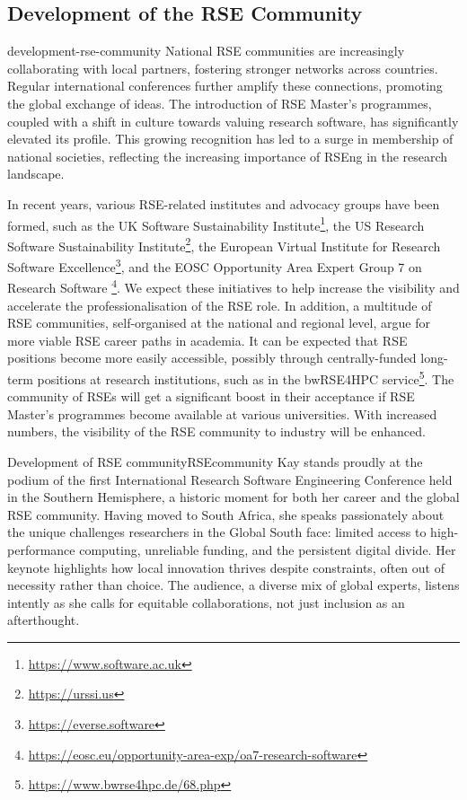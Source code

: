 \documentclass{eceasst}
\begin{document}
\subsection{Development of the RSE Community}
\begin{whatis}{}{development-rse-community}
National RSE communities are increasingly collaborating with local partners,
fostering stronger networks across countries.
Regular international conferences further amplify these connections,
promoting the global exchange of ideas. The introduction of RSE Master's programmes,
coupled with a shift in culture towards valuing research software,
has significantly elevated its profile.
This growing recognition has led to a surge in membership of national societies,
reflecting the increasing importance of RSEng in the research landscape.
\end{whatis}
In recent years, various RSE-related institutes and advocacy groups have been formed, such as
the UK Software Sustainability Institute\footnote{\url{https://www.software.ac.uk}},
the US Research Software Sustainability Institute\footnote{\url{https://urssi.us}},
the European Virtual Institute for Research Software Excellence\footnote{\url{https://everse.software}},
and the EOSC Opportunity Area Expert Group 7 on Research Software%
\footnote{\url{https://eosc.eu/opportunity-area-exp/oa7-research-software}}.
We expect these initiatives to help increase the visibility and accelerate
the professionalisation of the RSE role.
In addition, a multitude of RSE communities, self-organised at the national and regional level,
argue for more viable RSE career paths in academia.
It can be expected that RSE positions become more easily accessible,
possibly through centrally-funded long-term positions at research institutions,
such as in the bwRSE4HPC service\footnote{\url{https://www.bwrse4hpc.de/68.php}}.
The community of RSEs will get a significant boost in their acceptance
if RSE Master's programmes become available at various universities.
With increased numbers, the visibility of the RSE community to industry will be enhanced.
\begin{story}{Development of RSE community}{RSEcommunity}
Kay stands proudly at the podium of the first International Research
Software Engineering Conference held in the Southern Hemisphere,
a historic moment for both her career and the global RSE community.
Having moved to South Africa, she speaks passionately about the unique
challenges researchers in the Global South face: limited access
to high-performance computing, unreliable funding,
and the persistent digital divide.
Her keynote highlights how local innovation thrives despite constraints,
often out of necessity rather than choice.
The audience, a diverse mix of global experts, listens intently as she calls
for equitable collaborations, not just inclusion as an afterthought.
\end{story}
\end{document}
